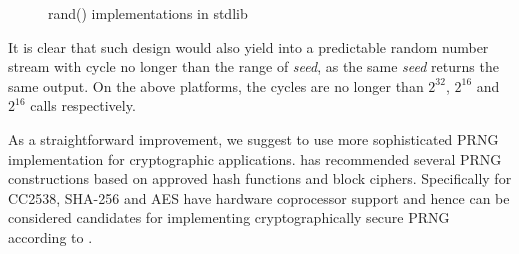 \begin{figure}

\caption{rand() implementations in stdlib}
\label{rand}
\end{figure}

It is clear that such design would also yield into a predictable random number stream with cycle no longer than the range of \textit{seed}, as the same \textit{seed} returns the same output. On the above platforms, the cycles are no longer than $2^{32}$, $2^{16}$ and $2^{16}$ calls respectively.

As a straightforward improvement, we suggest to use more sophisticated PRNG implementation for cryptographic applications. \cite{NISTPRNG} has recommended several PRNG constructions based on approved hash functions and block ciphers. Specifically for CC2538, SHA-256 and AES have hardware coprocessor support and hence can be considered candidates for implementing cryptographically secure PRNG according to \cite{NISTPRNG}.